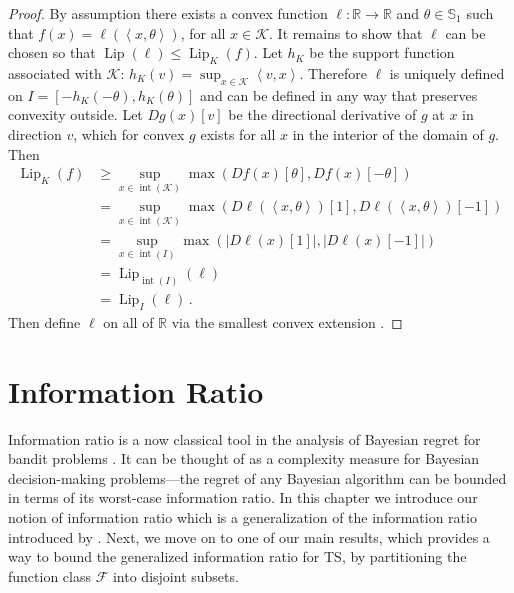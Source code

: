 \documentclass[letter, 12pt]{report}
\newcommand{\R}{\mathbb R}
\newcommand{\ip}[1]{\left \langle #1 \right \rangle}
\newcommand{\sphere}{\mathbb{S}}
\newcommand{\cK}{\mathcal K}
\newcommand{\sF}{\mathscr F}
\newcommand{\lip}{\operatorname{Lip}}
\newcommand{\interior}{\operatorname{int}}
\newcommand{\1}{\mathbf{1}}
\newcommand{\ts}{\textsc{TS}\xspace}
\theoremstyle{plain}
\theoremstyle{definition}
\theoremstyle{remark}
\begin{document}
\begin{proof}
    By assumption there exists a convex function $\ell : \R \to \R$ and $\theta \in \sphere_1$ such that $f(x) = \ell(\ip{x, \theta})$, for all $x \in \cK$.
    It remains to show that $\ell$ can be chosen so that $\lip(\ell) \leq \lip_K(f)$.
    Let $h_K$ be the support function associated with $\cK$: $h_K(v) = \sup_{x \in \cK} \ip{v, x}$.
    Therefore $\ell$ is uniquely defined on $I = [-h_K(-\theta), h_K(\theta)]$ and can be defined in any way that preserves convexity outside.
    Let $Dg(x)[v]$ be the directional derivative of $g$ at $x$ in direction $v$, which for convex $g$ exists for all $x$ in the interior of the domain of $g$.
    Then
    \begin{align*}
        \lip_K(f)
         & \geq \sup_{x \in \interior(\cK)} \max(Df(x)[\theta], Df(x)[-\theta])                  \\
         & = \sup_{x \in \interior(\cK)} \max(D\ell(\ip{x,\theta})[1], D\ell(\ip{x,\theta})[-1]) \\
         & = \sup_{x \in \interior(I)} \max(|D\ell(x)[1]|, |D\ell(x)[-1]|)                       \\
         & = \lip_{\interior(I)}(\ell)                                                           \\
         & = \lip_I(\ell) \,.
    \end{align*}
    Then define $\ell$ on all of $\R$ via the smallest convex extension \citep[Proposition 3.18, for example]{lat24book}.
\end{proof}

\chapter{Information Ratio}\label{ch:gir}
Information ratio is a now classical tool in the analysis of Bayesian regret for bandit problems \citep{RV16}.
It can be thought of as a complexity measure for Bayesian decision-making problems---the regret of any Bayesian algorithm can be bounded in terms of its worst-case information ratio.
In this chapter we introduce our notion of information ratio which is a generalization of the information ratio introduced by \cite{RV16}.
Next, we move on to one of our main results, which provides a way to bound the generalized information ratio for \ts{}, by partitioning the function class $\sF$ into disjoint subsets.
\end{document}
